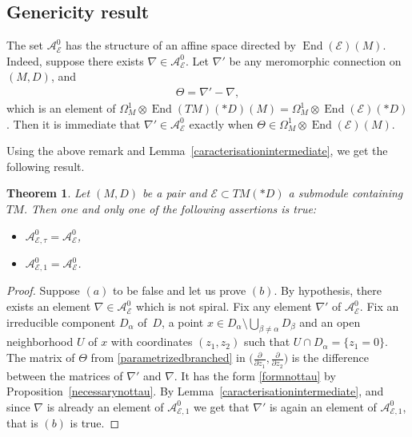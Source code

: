 \documentclass[pdftex]{sigma}
\newcommand{\der}[2]{\frac{\partial #1}{\partial#2}}
\numberwithin{equation}{section}
\newtheorem{Theorem}{Theorem}[section]
\begin{document}
\subsection{Genericity result}
The set $\mathcal{A}^0_\mathcal{E}$ has the structure of an affine space directed by $\operatorname{End}(\mathcal{E})(M)$. Indeed, suppose there exists $\nabla \in \mathcal{A}^0_\mathcal{E}$. Let $\nabla'$ be any meromorphic connection on $(M,D)$, and
 \begin{gather}\label{parametrizedbranched} \Theta = \nabla' - \nabla, \end{gather}
 which is an element of $\Omega^1_M\otimes \operatorname{End}(TM)(* D)(M) = \Omega^1_M\otimes \operatorname{End}(\mathcal{E})(* D)$. Then it is immediate that $\nabla' \in \mathcal{A}^0_\mathcal{E}$ exactly when $\Theta\in \Omega^1_M\otimes \operatorname{End}(\mathcal{E})(M)$.

Using the above remark and Lemma~\ref{caracterisationintermediate}, we get the following result.

\begin{Theorem}\label{genericity} Let $(M,D)$ be a pair and $\mathcal{E}\subset TM(* D)$ a submodule containing $TM$. Then one and only one of the following assertions is true: \begin{itemize}\itemsep=0pt
 \item[$(a)$] $\mathcal{A}^0_{\mathcal{E},\tau}=\mathcal{A}^0_\mathcal{E}$,
\item[$(b)$] $\mathcal{A}^0_{\mathcal{E},1}=\mathcal{A}^0_\mathcal{E}$.
\end{itemize} \end{Theorem}
\begin{proof}
Suppose $(a)$ to be false and let us prove $(b)$. By hypothesis, there exists an element $\nabla\in \mathcal{A}^0_\mathcal{E}$ which is not spiral. Fix any element $\nabla'$ of $\mathcal{A}^0_\mathcal{E}$. Fix an irreducible component $D_\alpha$ of~$D$, a point $x\in D_\alpha \setminus \bigcup_{\beta\neq\alpha} D_\beta$ and an open neighborhood $U$ of $x$ with coordinates $(z_1,z_2)$ such that $U\cap D_\alpha = \{z_1=0\}$. The matrix of $\Theta$ from \eqref{parametrizedbranched} in $\big(\der{}{z_1},\der{}{z_2}\big)$ is the difference between the matrices of $\nabla'$ and $\nabla$. It has the form \eqref{formnottau} by Proposition~\ref{necessarynottau}. By Lemma~\ref{caracterisationintermediate}, and since $\nabla$ is already an element of $\mathcal{A}^0_{\mathcal{E},1}$ we get that $\nabla'$ is again an element of $\mathcal{A}^0_{\mathcal{E},1}$, that is $(b)$ is true.
\end{proof}
\end{document}

